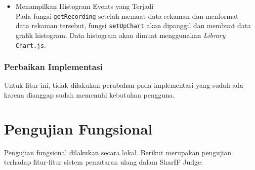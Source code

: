 \begin{itemize}
    \item Menampilkan Histogram Events yang Terjadi \\
    Pada fungsi \verb|getRecording| setelah memuat data rekaman dan menformat data rekaman tersebut, fungsi \verb|setUpChart| akan dipanggil dan membuat data grafik histogram. Data histogram akan dimuat menggunakan \textit{Library} \verb|Chart.js|.

\end{itemize}

\subsubsection{Perbaikan Implementasi}

Untuk fitur ini, tidak dilakukan perubahan pada implementasi yang sudah ada karena dianggap sudah memenuhi kebutuhan pengguna.

\section{Pengujian Fungsional}
\label{sec:5:fungsional}

Pengujian fungsional dilakukan secara lokal. Berikut merupakan pengujian terhadap fitur-fitur sistem pemutaran ulang dalam SharIF Judge:

